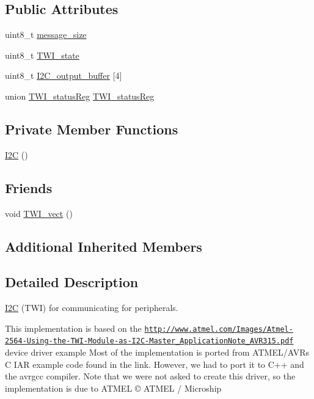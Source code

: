 \subsection*{Public Attributes}
\begin{DoxyCompactItemize}
\item 
uint8\+\_\+t \hyperlink{class_i2_c_a88add0edd8c518054944a8188ab11d0c}{message\+\_\+size}
\item 
uint8\+\_\+t \hyperlink{class_i2_c_aeb2f95017c3d3440a3fc27a20994fac7}{T\+W\+I\+\_\+state}
\item 
uint8\+\_\+t \hyperlink{class_i2_c_a4de289c8a3651d7b6aaca518844bb3f1}{I2\+C\+\_\+output\+\_\+buffer} \mbox{[}4\mbox{]}
\item 
union \hyperlink{union_t_w_i__status_reg}{T\+W\+I\+\_\+status\+Reg} \hyperlink{class_i2_c_a07cc6b21ede25e6b3ef1e9b3131108e6}{T\+W\+I\+\_\+status\+Reg}
\end{DoxyCompactItemize}
\subsection*{Private Member Functions}
\begin{DoxyCompactItemize}
\item 
\hyperlink{class_i2_c_a7a9a84fccdacb3346ff97d6f3e158850}{I2C} ()
\end{DoxyCompactItemize}
\subsection*{Friends}
\begin{DoxyCompactItemize}
\item 
void \hyperlink{class_i2_c_a9d6ec6457f300cca833eb7193feabfbc}{T\+W\+I\+\_\+vect} ()
\end{DoxyCompactItemize}
\subsection*{Additional Inherited Members}


\subsection{Detailed Description}
\hyperlink{class_i2_c}{I2C} (T\+WI) for communicating for peripherals. 

This implementation is based on the \href{http://www.atmel.com/Images/Atmel-2564-Using-the-TWI-Module-as-I2C-Master_ApplicationNote_AVR315.pdf}{\tt http\+://www.\+atmel.\+com/\+Images/\+Atmel-\/2564-\/\+Using-\/the-\/\+T\+W\+I-\/\+Module-\/as-\/\+I2\+C-\/\+Master\+\_\+\+Application\+Note\+\_\+\+A\+V\+R315.\+pdf} device driver example Most of the implementation is ported from A\+T\+M\+E\+L/\+A\+V\+Rs C I\+AR example code found in the link. However, we had to port it to C++ and the avrgcc compiler. Note that we were not asked to create this driver, so the implementation is due to A\+T\+M\+EL © A\+T\+M\+EL / Microship 

